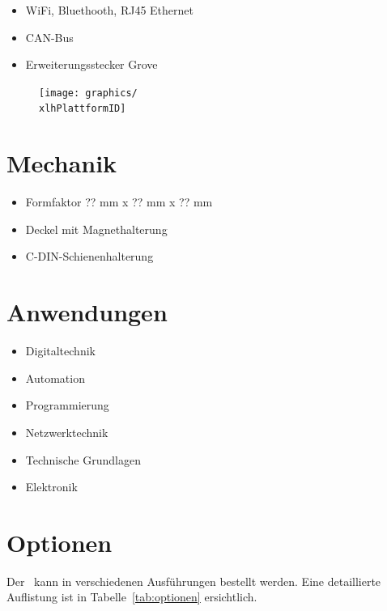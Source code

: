 \documentclass[10pt]{datasheet}
\begin{document}
\begin{itemize}
    \item WiFi, Bluethooth, RJ45 Ethernet
    \item CAN-Bus
    \item Erweiterungsstecker Grove
\end{itemize}

\vfill\break

\begin{figure}[h]
    \centering
    \texttt{[image: graphics/\\xlhPlattformID]}
\end{figure}

\section{Mechanik}

\begin{itemize}
    \item Formfaktor ?? mm x ?? mm x ?? mm
    \item Deckel mit Magnethalterung
    \item C-DIN-Schienenhalterung
\end{itemize}

\section{Anwendungen}

\begin{itemize}
    \item Digitaltechnik
    \item Automation
    \item Programmierung
    \item Netzwerktechnik
    \item Technische Grundlagen
    \item Elektronik
\end{itemize}

\vfill\break


\onecolumn

\section{Optionen}
Der \xlhPlattformID\ kann in verschiedenen Ausführungen bestellt werden.
Eine detaillierte Auflistung ist in Tabelle~\ref{tab:optionen} ersichtlich.
\end{document}
